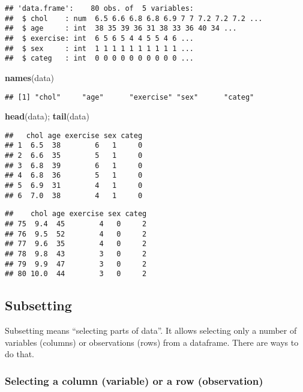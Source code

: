 \documentclass[]{book}
\newenvironment{Shaded}{\begin{snugshade}}{\end{snugshade}}
\newcommand{\KeywordTok}[1]{\textcolor[rgb]{0.13,0.29,0.53}{\textbf{{#1}}}}
\newcommand{\NormalTok}[1]{{#1}}
\theoremstyle{definition}
\theoremstyle{definition}
\theoremstyle{remark}
\begin{document}
\begin{verbatim}
## 'data.frame':    80 obs. of  5 variables:
##  $ chol    : num  6.5 6.6 6.8 6.8 6.9 7 7 7.2 7.2 7.2 ...
##  $ age     : int  38 35 39 36 31 38 33 36 40 34 ...
##  $ exercise: int  6 5 6 5 4 4 5 5 4 6 ...
##  $ sex     : int  1 1 1 1 1 1 1 1 1 1 ...
##  $ categ   : int  0 0 0 0 0 0 0 0 0 0 ...
\end{verbatim}

\begin{Shaded}
\begin{Highlighting}[]
\KeywordTok{names}\NormalTok{(data)}
\end{Highlighting}
\end{Shaded}

\begin{verbatim}
## [1] "chol"     "age"      "exercise" "sex"      "categ"
\end{verbatim}

\begin{Shaded}
\begin{Highlighting}[]
\KeywordTok{head}\NormalTok{(data); }\KeywordTok{tail}\NormalTok{(data)}
\end{Highlighting}
\end{Shaded}

\begin{verbatim}
##   chol age exercise sex categ
## 1  6.5  38        6   1     0
## 2  6.6  35        5   1     0
## 3  6.8  39        6   1     0
## 4  6.8  36        5   1     0
## 5  6.9  31        4   1     0
## 6  7.0  38        4   1     0
\end{verbatim}

\begin{verbatim}
##    chol age exercise sex categ
## 75  9.4  45        4   0     2
## 76  9.5  52        4   0     2
## 77  9.6  35        4   0     2
## 78  9.8  43        3   0     2
## 79  9.9  47        3   0     2
## 80 10.0  44        3   0     2
\end{verbatim}

\subsection{Subsetting}\label{subsetting}

Subsetting means ``selecting parts of data''. It allows selecting only a
number of variables (columns) or observations (rows) from a dataframe.
There are ways to do that.

\subsubsection{Selecting a column (variable) or a row
(observation)}\label{selecting-a-column-variable-or-a-row-observation}
\end{document}

